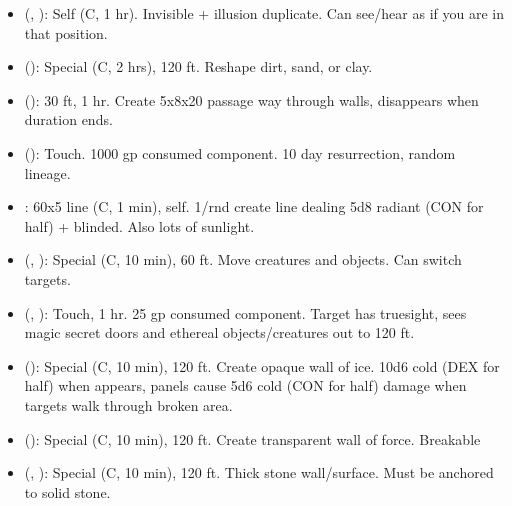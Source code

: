 \begin{itemize}
	\item {} (, ): Self (C, 1 hr). Invisible + illusion duplicate. Can see/hear as if you are in that position. 
	\item {} (): Special (C, 2 hrs), 120 ft. Reshape dirt, sand, or clay.
	\item {} (): 30 ft, 1 hr. Create 5x8x20 passage way through walls, disappears when duration ends.
	\item {} (): Touch. 1000 gp consumed component. 10 day resurrection, random lineage.
	\item {} : 60x5 line (C, 1 min), self. 1/rnd create line dealing 5d8 radiant (CON for half) + blinded. Also lots of sunlight.
	\item {} (, ): Special (C, 10 min), 60 ft. Move creatures and objects. Can switch targets.
	\item {} (, ): Touch, 1 hr. 25 gp consumed component. Target has truesight, sees magic secret doors and ethereal objects/creatures out to 120 ft.
	\item {} (): Special (C, 10 min), 120 ft. Create opaque wall of ice. 10d6 cold (DEX for half) when appears, panels cause 5d6 cold (CON for half) damage when targets walk through broken area. 
	\item {} (): Special (C, 10 min), 120 ft. Create transparent wall of force. Breakable
	\item {} (, ): Special (C, 10 min), 120 ft. Thick stone wall/surface. Must be anchored to solid stone.
\end{itemize}

